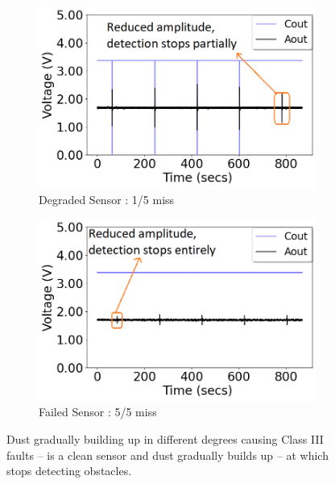 \begin{figure}[htbp]
\begin{subfigure}[t]{0.23\textwidth}
		\centering
		\includegraphics[width=\textwidth]{figures/gradual_degradation_dust/Stage2.png}
		\caption{Degraded Sensor : 1/5 miss}
		\label{fig:pir_sensor_classIII_fault_bad2}
	\end{subfigure}		
	\hspace{1ex}
	\begin{subfigure}[t]{0.23\textwidth}
		\centering
		\includegraphics[width=\textwidth]{figures/gradual_degradation_dust/Stage3.png}
		\caption{Failed Sensor : 5/5 miss}
		\label{fig:pir_sensor_classIII_fault_bad3}
	\end{subfigure}	
	\caption{Dust gradually building up in different degrees causing Class III faults -- \ca is a clean sensor and dust gradually builds up \cb -- \cd at which stops detecting obstacles.}
	\label{fig:pir_sensor_classIII_fault_gradual}
\end{figure}

